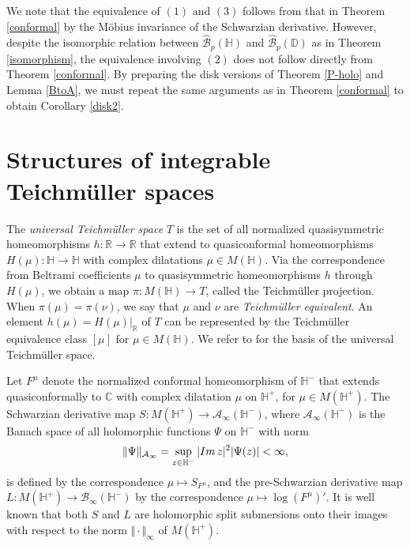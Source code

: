 \documentclass[amstex,12pt,reqno]{amsart}
\theoremstyle{definition}
\begin{document}
We note that the equivalence of $(1)$ and $(3)$ follows from that in Theorem \ref{conformal}
by the M\"obius invariance of the Schwarzian derivative.
However, despite the isomorphic relation between $\widehat{\mathcal B}_p(\mathbb H)$ and
$\widehat{\mathcal B}_p(\mathbb D)$ as in Theorem \ref{isomorphism},
the equivalence involving $(2)$ does not follow directly from Theorem \ref{conformal}.
By preparing the disk versions of Theorem \ref{P-holo} and
Lemma \ref{BtoA},
we must repeat the same arguments as in Theorem \ref{conformal}
to obtain Corollary \ref{disk2}.



\section{Structures of integrable Teich\-m\"ul\-ler spaces}\label{5}

The {\it universal Teich\-m\"ul\-ler space} $T$ is the
set of all normalized quasisymmetric homeo\-morphisms $h:\mathbb R \to \mathbb R$
that extend to quasiconformal homeomorphisms $H(\mu):\mathbb H \to \mathbb H$
with complex dilatations $\mu \in M(\mathbb H)$. Via the correspondence from Beltrami coefficients $\mu$
to quasisymmetric homeomorphisms $h$ through $H(\mu)$, we obtain
a map $\pi: M(\mathbb H) \to T$, called the Teich\-m\"ul\-ler projection.
When $\pi(\mu)=\pi(\nu)$, we say that $\mu$ and $\nu$ are {\it Teich\-m\"ul\-ler equivalent}.
An element $h(\mu)=H(\mu)|_{\mathbb R}$ of $T$ 
can be represented by the Teich\-m\"ul\-ler equivalence class $[\mu]$ for $\mu \in M(\mathbb H)$.
We refer to \cite[Chapter 3]{Le} for the basis of the universal Teich\-m\"ul\-ler space.

Let $F^\mu$ denote the normalized conformal homeomorphism of $\mathbb H^-$ that extends quasiconformally to
$\mathbb C$ with complex dilatation $\mu$ on $\mathbb H^+$,
for $\mu \in M(\mathbb H^+)$.
The Schwarzian derivative map 
$S:M(\mathbb H^+) \to {\mathcal A}_\infty(\mathbb H^-)$, where
${\mathcal A}_\infty(\mathbb H^-)$ is the Banach space of all holomorphic functions $\Psi$ on $\mathbb H^-$ with norm
$$
\Vert \Psi \Vert_{\mathcal A_\infty}=
\sup_{z \in \mathbb H^-} |{\rm Im}\,z|^2|\Psi(z)|<\infty,
$$ 
is defined by the
correspondence $\mu \mapsto S_{F^\mu}$,
and the pre-Schwarzian derivative map $L:M(\mathbb H^+) \to {\mathcal B}_\infty(\mathbb H^-)$
by the
correspondence $\mu \mapsto \log (F^\mu)'$. It is well known that both $S$ and $L$ are holomorphic split submersions onto
their images with respect to the norm $\Vert \cdot \Vert_\infty$ of $M(\mathbb H^+)$.
\end{document}

